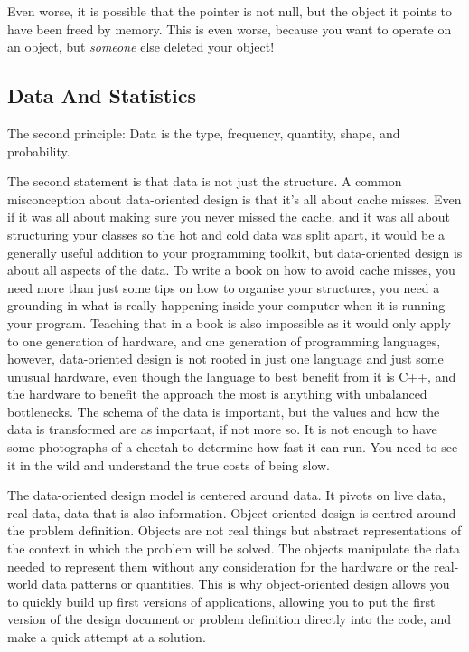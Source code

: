 \documentclass[a4paper,12pt]{book}
\begin{document}
Even worse, it is possible that the pointer is not null, but the object it points to have been freed by memory.
This is even worse, because you want to operate on an object, but \textit{someone} else deleted your object!

\subsection{Data And Statistics}

The second principle: Data is the type, frequency, quantity, shape, and probability.

The second statement is that data is not just the structure.
A common misconception about data-oriented design is that it's all about cache misses.
Even if it was all about making sure you never missed the cache, and it was all about structuring your classes so the hot and cold data was split apart, it would be a generally useful addition to your programming toolkit, but data-oriented design is about all aspects of the data.
To write a book on how to avoid cache misses, you need more than just some tips on how to organise your structures, you need a grounding in what is really happening inside your computer when it is running your program.
Teaching that in a book is also impossible as it would only apply to one generation of hardware, and one generation of programming languages, however, data-oriented design is not rooted in just one language and just some unusual hardware, even though the language to best benefit from it is C++, and the hardware to benefit the approach the most is anything with unbalanced bottlenecks.
The schema of the data is important, but the values and how the data is transformed are as important, if not more so.
It is not enough to have some photographs of a cheetah to determine how fast it can run.
You need to see it in the wild and understand the true costs of being slow.

The data-oriented design model is centered around data.
It pivots on live data, real data, data that is also information.
Object-oriented design is centred around the problem definition.
Objects are not real things but abstract representations of the context in which the problem will be solved.
The objects manipulate the data needed to represent them without any consideration for the hardware or the real-world data patterns or quantities.
This is why object-oriented design allows you to quickly build up first versions of applications, allowing you to put the first version of the design document or problem definition directly into the code, and make a quick attempt at a solution.
\end{document}
